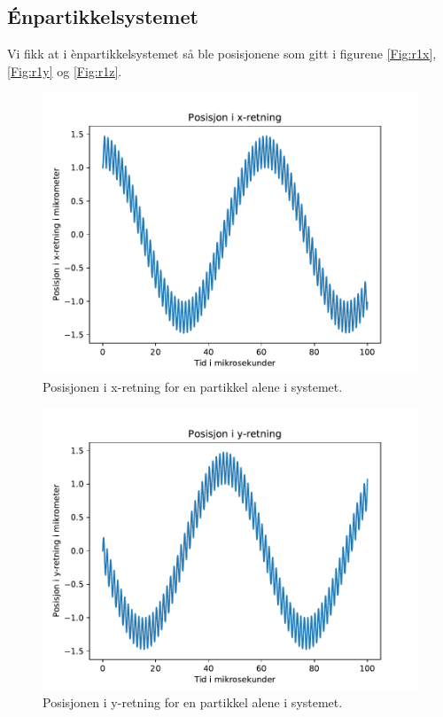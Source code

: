 \documentclass[reprint,english,notitlepage, nofootinbib]{revtex4-1}  %
\begin{document}
\subsection*{Énpartikkelsystemet}
Vi fikk at i ènpartikkelsystemet så ble posisjonene som gitt i figurene \autoref{Fig:r1x}, \autoref{Fig:r1y} og \autoref{Fig:r1z}.
\begin{figure}[H]
	\centering 
	\includegraphics[scale=0.4]{../pythonplots/r1x.pdf}
	\caption{Posisjonen i x-retning for en partikkel alene i systemet.}
	\label{Fig:r1x}
\end{figure}
\begin{figure}[H]
	\centering 
	\includegraphics[scale=0.4]{../pythonplots/r1y.pdf}
	\caption{Posisjonen i y-retning for en partikkel alene i systemet.}
	\label{Fig:r1y}
\end{figure}
\end{document}
